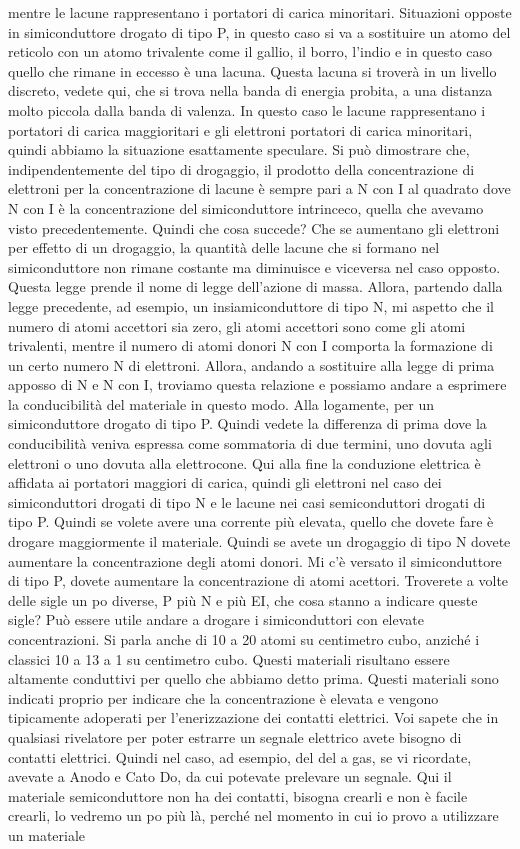 mentre le lacune rappresentano i portatori di carica minoritari. Situazioni opposte in simiconduttore drogato di tipo P, in questo caso si va a sostituire un atomo del reticolo con un atomo trivalente come il gallio, il borro, l'indio e in questo caso quello che rimane in eccesso è una lacuna. Questa lacuna si troverà in un livello discreto, vedete qui, che si trova nella banda di energia probita, a una distanza molto piccola dalla banda di valenza. In questo caso le lacune rappresentano i portatori di carica maggioritari e gli elettroni portatori di carica minoritari, quindi abbiamo la situazione esattamente speculare. Si può dimostrare che, indipendentemente del tipo di drogaggio, il prodotto della concentrazione di elettroni per la concentrazione di lacune è sempre pari a N con I al quadrato dove N con I è la concentrazione del simiconduttore intrinceco, quella che avevamo visto precedentemente. Quindi che cosa succede? Che se aumentano gli elettroni per effetto di un drogaggio, la quantità delle lacune che si formano nel simiconduttore non rimane costante ma diminuisce e viceversa nel caso opposto. Questa legge prende il nome di legge dell'azione di massa. Allora, partendo dalla legge precedente, ad esempio, un insiamiconduttore di tipo N, mi aspetto che il numero di atomi accettori sia zero, gli atomi accettori sono come gli atomi trivalenti, mentre il numero di atomi donori N con I comporta la formazione di un certo numero N di elettroni. Allora, andando a sostituire alla legge di prima apposso di N e N con I, troviamo questa relazione e possiamo andare a esprimere la conducibilità del materiale in questo modo. Alla logamente, per un simiconduttore drogato di tipo P. Quindi vedete la differenza di prima dove la conducibilità veniva espressa come sommatoria di due termini, uno dovuta agli elettroni o uno dovuta alla elettrocone. Qui alla fine la conduzione elettrica è affidata ai portatori maggiori di carica, quindi gli elettroni nel caso dei simiconduttori drogati di tipo N e le lacune nei casi semiconduttori drogati di tipo P. Quindi se volete avere una corrente più elevata, quello che dovete fare è drogare maggiormente il materiale. Quindi se avete un drogaggio di tipo N dovete aumentare la concentrazione degli atomi donori. Mi c'è versato il simiconduttore di tipo P, dovete aumentare la concentrazione di atomi acettori. Troverete a volte delle sigle un po diverse, P più N e più EI, che cosa stanno a indicare queste sigle? Può essere utile andare a drogare i simiconduttori con elevate concentrazioni. Si parla anche di 10 a 20 atomi su centimetro cubo, anziché i classici 10 a 13 a 1 su centimetro cubo. Questi materiali risultano essere altamente conduttivi per quello che abbiamo detto prima. Questi materiali sono indicati proprio per indicare che la concentrazione è elevata e vengono tipicamente adoperati per l'enerizzazione dei contatti elettrici. Voi sapete che in qualsiasi rivelatore per poter estrarre un segnale elettrico avete bisogno di contatti elettrici. Quindi nel caso, ad esempio, del del a gas, se vi ricordate, avevate a Anodo e Cato Do, da cui potevate prelevare un segnale. Qui il materiale semiconduttore non ha dei contatti, bisogna crearli e non è facile crearli, lo vedremo un po più là, perché nel momento in cui io provo a utilizzare un materiale 
